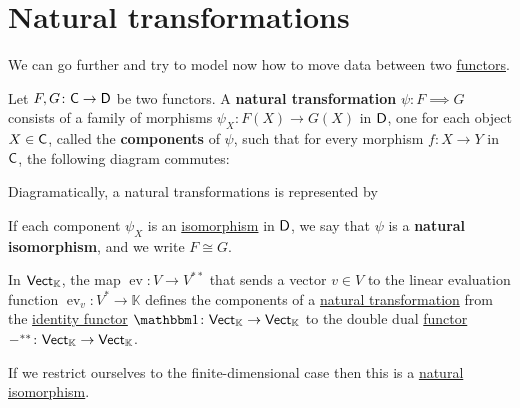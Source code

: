 \documentclass[../../main]{subfiles}
\begin{document}
\section{Natural transformations}

We can go further and try to model now how to move data between two \hyperref[def:functor]{functors}.
\begin{definition}\label{def:natural-transformation}
  Let \(F, G\colon \mathsf{C} \to \mathsf{D}\) be two functors. A \textbf{natural transformation} \(\psi\colon F \implies G\) consists of a family of morphisms \(\psi_X: F(X) \to G(X)\) in \(\mathsf{D}\), one for each object \(X \in \mathsf{C}\), called the \textbf{components} of \(\psi\), such that for every morphism \(f\colon X \to Y\) in \(\mathsf{C}\), the following diagram commutes:
  \begin{center}
  \end{center}
  Diagramatically, a natural transformations is represented by
  \begin{center}
  \end{center}
  
  If each component \(\psi_{X}\) is an \hyperref[def:categorical-isomorphism]{isomorphism} in \(\mathsf{D}\), we say that \(\psi\) is a \textbf{natural isomorphism}, and we write \(F \cong G\).
\end{definition}

\begin{example}
  In \(\mathsf{Vect}_{\mathbb{K}}\), the map \(\operatorname{ev}\colon V \to V^{\ast\ast}\) that sends a vector \(v \in V\) to the linear evaluation function \(\operatorname{ev}_{v}\colon V^{\ast} \to \mathbb{K}\) defines the components of a \hyperref[def:natural-transformation]{natural transformation} from the \hyperref[ex:identity-functor]{identity functor} \(\id\colon \Vect_{\mathbb{K}} \to \Vect_{\mathbb{K}}\) to the double dual \hyperref[def:functor]{functor} \(-^{\ast\ast}\colon \mathsf{Vect}_{\mathbb{K}} \to \mathsf{Vect}_{\mathbb{K}}\).

  If we restrict ourselves to the finite-dimensional case then this is a \hyperref[def:natural-transformation]{natural isomorphism}.
\end{example}
\end{document}
